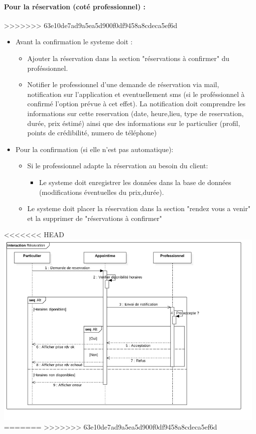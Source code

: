 \documentclass{article}
\begin{document}
\begin{itemize}
\begin{itemize}
\paragraph{Pour la réservation (coté professionnel) :}
>>>>>>> 63e10de7ad9a5ea5d900f0df9458a8cdeca5ef6d
\begin{itemize}
\item Avant la confirmation le systeme doit :
	\begin{itemize}
	\item Ajouter la réservation dans la section "réservations à confirmer" du  proféssionnel.
    \item Notifier le professionnel d'une demande de réservation via mail, notification sur l'application et eventuellement sms (si le proféssionnel à confirmé l'option prévue à cet effet).
		La notification doit comprendre les informations sur cette reservation (date, heure,lieu, type de reservation, durée, prix éstimé)
		ainsi que des informations sur le particulier (profil, points de crédibilité, numero de téléphone)
	\end{itemize}
\item Pour la confirmation (si elle n'est pas automatique):
	\begin{itemize}
	\item Si le professionnel adapte la réservation au besoin du client:
		\begin{itemize}
		\item Le systeme doit enregistrer les données dans la base de données (modifications éventuelles du prix,durée).
		\end{itemize}
	\end{itemize}
	\begin{itemize}
    \item Le systeme doit placer la réservation dans la section "rendez vous a venir" et la supprimer de "réservations à confirmer"
	\end{itemize}
\end{itemize}

<<<<<<< HEAD
\includegraphics[scale=0.5]{ShematDiagrammes/sequenceReservation.jpg}
=======
>>>>>>> 63e10de7ad9a5ea5d900f0df9458a8cdeca5ef6d






\end{itemize}
\end{itemize}
\end{document}
